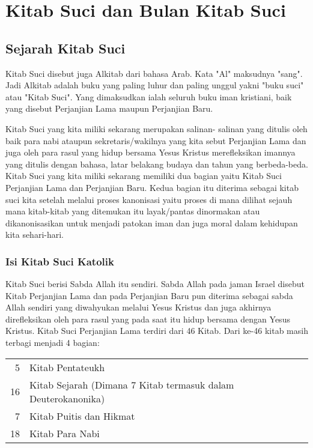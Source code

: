 \section*{Kitab Suci dan Bulan Kitab Suci}

\subsection*{Sejarah Kitab Suci}

Kitab  Suci  disebut juga Alkitab dari bahasa Arab. Kata "Al"  maksudnya  "sang". Jadi  Alkitab adalah buku   yang    paling  luhur  dan paling unggul yakni "buku  suci"  atau  "Kitab  Suci".  Yang  dimaksudkan  ialah seluruh buku  iman kristiani, baik yang  disebut  Perjanjian Lama maupun Perjanjian Baru. 

Kitab Suci yang kita miliki sekarang merupakan salinan- salinan yang ditulis oleh baik para nabi ataupun sekretaris/wakilnya yang kita sebut Perjanjian Lama dan juga oleh para rasul yang hidup bersama Yesus Kristus merefleksikan imannya yang ditulis dengan bahasa, latar belakang budaya dan tahun yang berbeda-beda. Kitab Suci yang kita miliki sekarang memiliki dua bagian yaitu Kitab Suci Perjanjian Lama dan Perjanjian Baru. Kedua bagian itu diterima sebagai kitab suci kita setelah melalui proses kanonisasi yaitu proses di mana dilihat sejauh mana kitab-kitab yang ditemukan itu layak/pantas dinormakan atau dikanonisasikan untuk menjadi patokan iman dan juga moral dalam kehidupan kita sehari-hari.  

\subsubsection*{Isi Kitab Suci Katolik}
Kitab Suci berisi Sabda Allah itu sendiri. Sabda Allah pada jaman Israel disebut Kitab Perjanjian Lama dan pada Perjanjian Baru pun diterima sebagai sabda Allah sendiri yang diwahyukan melalui Yesus Kristus dan juga akhirnya direfleksikan oleh para rasul yang pada saat itu hidup bersama dengan Yesus Kristus. Kitab Suci Perjanjian Lama terdiri dari 46 Kitab. Dari ke-46 kitab masih terbagi menjadi 4 bagian:
   
\begin{tabular}{rp{8cm}}
5&Kitab Pentateukh \\
16&Kitab Sejarah (Dimana 7 Kitab termasuk dalam Deuterokanonika)\\
7&Kitab Puitis dan Hikmat\\
18&Kitab Para Nabi
\end{tabular}


